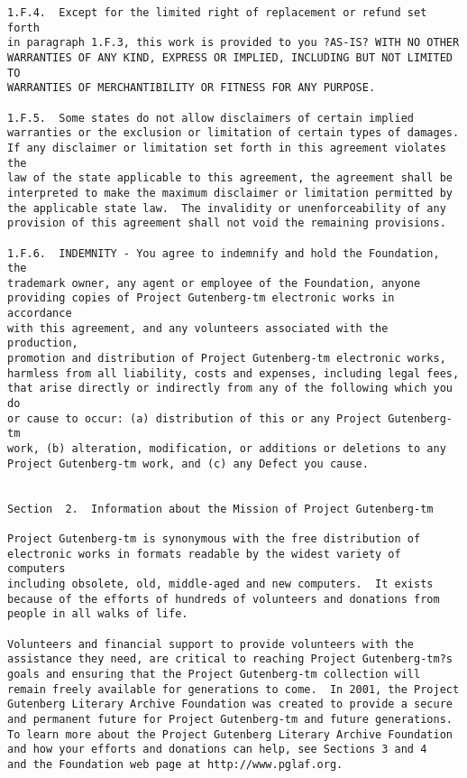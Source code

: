 \begin{Verbatim}[fontsize=\footnotesize]
1.F.4.  Except for the limited right of replacement or refund set forth
in paragraph 1.F.3, this work is provided to you ?AS-IS? WITH NO OTHER
WARRANTIES OF ANY KIND, EXPRESS OR IMPLIED, INCLUDING BUT NOT LIMITED TO
WARRANTIES OF MERCHANTIBILITY OR FITNESS FOR ANY PURPOSE.

1.F.5.  Some states do not allow disclaimers of certain implied
warranties or the exclusion or limitation of certain types of damages.
If any disclaimer or limitation set forth in this agreement violates the
law of the state applicable to this agreement, the agreement shall be
interpreted to make the maximum disclaimer or limitation permitted by
the applicable state law.  The invalidity or unenforceability of any
provision of this agreement shall not void the remaining provisions.

1.F.6.  INDEMNITY - You agree to indemnify and hold the Foundation, the
trademark owner, any agent or employee of the Foundation, anyone
providing copies of Project Gutenberg-tm electronic works in accordance
with this agreement, and any volunteers associated with the production,
promotion and distribution of Project Gutenberg-tm electronic works,
harmless from all liability, costs and expenses, including legal fees,
that arise directly or indirectly from any of the following which you do
or cause to occur: (a) distribution of this or any Project Gutenberg-tm
work, (b) alteration, modification, or additions or deletions to any
Project Gutenberg-tm work, and (c) any Defect you cause.


Section  2.  Information about the Mission of Project Gutenberg-tm

Project Gutenberg-tm is synonymous with the free distribution of
electronic works in formats readable by the widest variety of computers
including obsolete, old, middle-aged and new computers.  It exists
because of the efforts of hundreds of volunteers and donations from
people in all walks of life.

Volunteers and financial support to provide volunteers with the
assistance they need, are critical to reaching Project Gutenberg-tm?s
goals and ensuring that the Project Gutenberg-tm collection will
remain freely available for generations to come.  In 2001, the Project
Gutenberg Literary Archive Foundation was created to provide a secure
and permanent future for Project Gutenberg-tm and future generations.
To learn more about the Project Gutenberg Literary Archive Foundation
and how your efforts and donations can help, see Sections 3 and 4
and the Foundation web page at http://www.pglaf.org.



\end{Verbatim}
